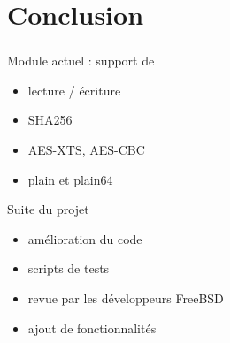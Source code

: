 \section{Conclusion}

\begin{frame}
	\frametitle{\insertsectionhead}
	\begin{block}{Module actuel : support de }
		\begin{itemize}
			\item lecture / écriture
			\item SHA256
			\item AES-XTS, AES-CBC
			\item plain et plain64
		\end{itemize}
	\end{block}
	\pause
	\begin{block}{Suite du projet}
		\begin{itemize}
			\item amélioration du code
			\item scripts de tests
			\item revue par les développeurs FreeBSD
			\item ajout de fonctionnalités
		\end{itemize}
	\end{block}
\end{frame}
